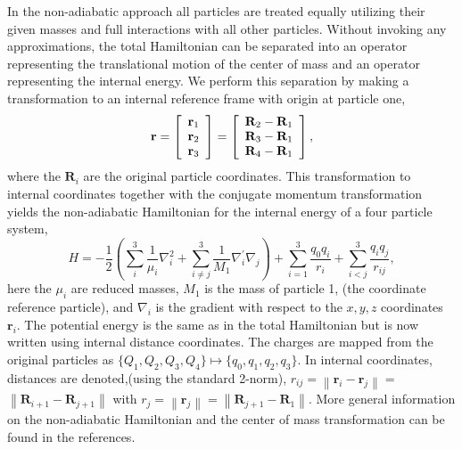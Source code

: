 In the non-adiabatic approach all particles are treated equally utilizing
their given masses and full interactions with all other particles. 
Without invoking any approximations, the total Hamiltonian 
can be separated into an operator representing the translational motion
of the center of mass and an operator representing the internal energy.
We perform this separation by making a transformation to an internal
reference frame with origin at particle one,
\begin{equation} \label{rdef}
\mathbf{r}=\left[
  \begin{array}[c]{c}
    \mathbf{r}_{1}\\
    \mathbf{r}_{2}\\
    \mathbf{r}_{3}
  \end{array}
  \right]  
  = \left[
    \begin{array}[c]{c}
      \mathbf{R}_{2}-\mathbf{R}_{1}\\
      \mathbf{R}_{3}-\mathbf{R}_{1}\\
      \mathbf{R}_{4}-\mathbf{R}_{1}\\
    \end{array}
  \right],
\end{equation}
where the $\mathbf{R}_{i}$ are the original particle coordinates.
This transformation to  internal coordinates together with the 
conjugate momentum transformation yields the non-adiabatic Hamiltonian
for the internal energy of a four particle system,
\begin{equation} \label{intham1}
H=-\frac{1}{2}\left(  \sum_{i}^{3}\frac{1}{\mu_{i}}\nabla_{i}^{2}
  +\sum_{i\neq j}^{3}\frac{1}{M_{1}}\nabla_{i}^{\prime}\nabla_{j} \right)
  +\sum_{i=1}^{3}\frac{q_{0}q_{i}}{r_{i}}  
  +\sum_{i<j}^{3}\frac{q_{i}q_{j}}{r_{ij}},
\end{equation}
here the $\mu_{i}$ are reduced masses, $M_{1}$ is the mass of particle 1,
(the coordinate reference particle), and $\nabla_{i}$ is the gradient with
respect to the $x,y,z$ coordinates $\mathbf{r}_{i}$. The potential energy is
the same as in the total Hamiltonian but is now written using internal
distance coordinates. The charges are mapped from the original particles as
$\{Q_{1},Q_{2},Q_{3},Q_{4}\}\mapsto\{q_{0},q_{1},q_{2},q_{3}\}$. 
In internal coordinates, distances are denoted,(using the standard 2-norm), 
$r_{ij}=\left\|  \mathbf{r}_{i}-\mathbf{r}_{j}\right\|  =$ 
$\left\|  \mathbf{R}_{i+1}-\mathbf{R}_{j+1}\right\|$ with 
$r_{j}=\left\|  \mathbf{r}_{j}\right\|  =
\left\|  \mathbf{R}_{j+1}-\mathbf{R}_{1}\right\|$.
More general information on the non-adiabatic Hamiltonian and the 
center of mass transformation can be found in the references\cite{Kinghorn99a}.

